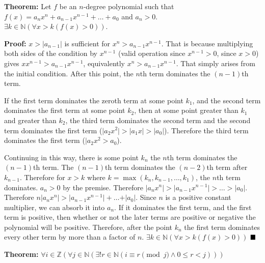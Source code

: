 

\setcounter{enumii}{10}
\item \textbf{Theorem:} Let \(f\) be an \(n\)-degree polynomial such that \(f(x) = a_n x^n + a_{n-1} x^{n-1} + \dots + a_0 \) and \(a_n > 0\). \(\exists k \in \mathbb N (\forall x > k (f(x) > 0))\).

\textbf{Proof:} \(x > \lvert a_{n-1} \rvert\) is sufficient for \(x^n > a_{n-1} x^{n-1}\). That is because multiplying both sides of the condition by \(x^{n-1}\) (valid operation since \(x^{n-1}>0\), since \(x>0\)) gives \(x x^{n-1} > a_{n-1} x^{n-1}\), equivalently \(x^n  > a_{n-1} x^{n-1}\). That simply arises from the initial condition. After this point, the \(n\)th term dominates the \((n-1)\)th term.

If the first term dominates the zeroth term at some point \(k_1\), and the second term dominates the first term at some point \(k_2\), then at some point greater than \(k_1\) and greater than \(k_2\), the third term dominates the second term and the second term dominates the first term (\(\lvert a_2 x^2 \rvert > \lvert a_1 x \rvert > \lvert a_0 \rvert\)). Therefore the third term dominates the first term (\(\lvert a_2 x^2 > a_0\)). 

Continuing in this way, there is some point \(k_n\) the \(n\)th term dominates the \((n-1)\)th term. The \((n-1)\)th term dominates the \((n-2)\)th term after \(k_{n-1}\). Therefore for \(x > k\) where \(k = \max(k_n, k_{n-1}, \dots, k_1)\), the \(n\)th term dominates. \(a_n > 0\) by the premise. Therefore \(\lvert a_n x^n \rvert > \lvert a_{n-1} x^{n-1} \rvert > \dots > \rvert a_0 \lvert\). Therefore \(n \lvert a_n x^n \rvert > \lvert a_{n-1} x^{n-1} \rvert + \dots + \rvert a_0 \lvert\). Since \(n\) is a positive constant multiplier, we can absorb it into \(a_n\). If it dominates the first term, and the first term is positive, then whether or not the later terms are positive or negative the polynomial will be positive. Therefore, after the point \(k_n\) the first term dominates every other term by more than a factor of \(n\). \(\exists k \in \mathbb N (\forall x > k (f(x) > 0))\) \(\small \blacksquare\)


\setcounter{enumii}{13}
\item \textbf{Theorem:} \(\forall i \in \mathbb Z (\forall j \in \mathbb N (\exists ! r \in \mathbb N (i \equiv r \pmod j \wedge 0 \leq r < j)))\)

